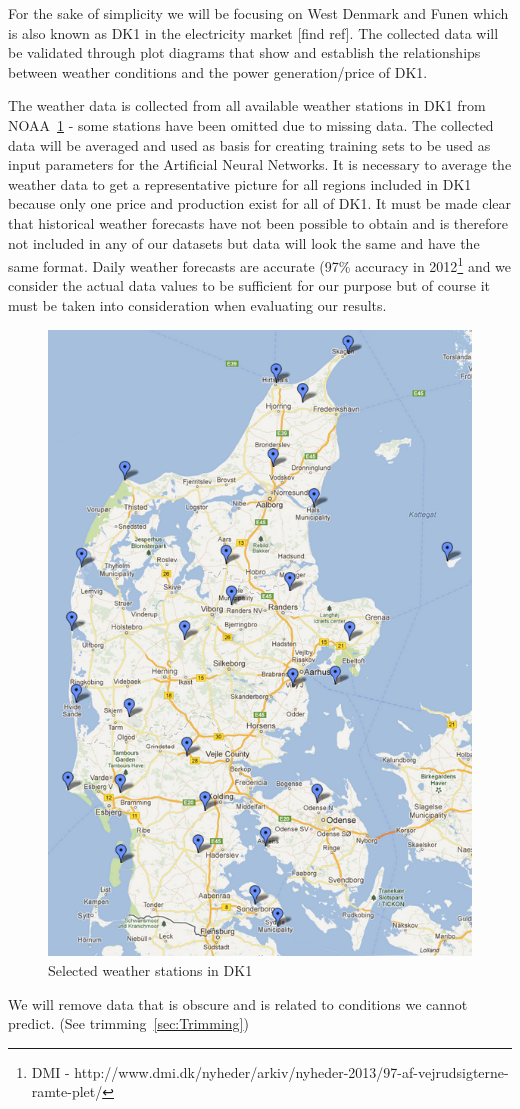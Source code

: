 For the sake of simplicity we will be focusing on West Denmark and Funen which is also known as DK1 in the electricity market [find ref]. The collected data will be validated through plot diagrams that show and establish the relationships between weather conditions and the power generation/price of DK1.

The weather data is collected from all available weather stations in DK1 from NOAA~\ref{fig:stations4average} - some stations have been omitted due to missing data. The collected data will be averaged and used as basis for creating training sets to be used as input parameters for the Artificial Neural Networks. It is necessary to average the weather data to get a representative picture for all regions included in DK1 because only one price and production exist for all of DK1. It must be made clear that historical weather forecasts have not been possible to obtain and is therefore not included in any of our datasets but data will look the same and have the same format. Daily weather forecasts are accurate (97\% accuracy in 2012\footnote{DMI - http://www.dmi.dk/nyheder/arkiv/nyheder-2013/97-af-vejrudsigterne-ramte-plet/} and we consider the actual data values to be sufficient for our purpose but of course it must be taken into consideration when evaluating our results.

\begin{figure}[H]
\centering
\includegraphics[width=0.85\linewidth]{billeder/stations4average.png}
\caption{Selected weather stations in DK1}
\label{fig:stations4average}
\end{figure}


We will remove data that is obscure and is related to conditions we cannot predict. (See trimming~\ref{sec:Trimming})

